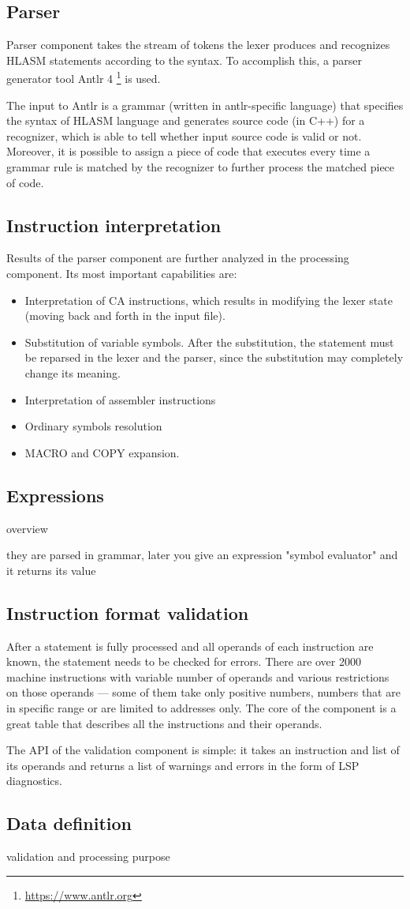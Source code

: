 \subsection{Parser}

Parser component takes the stream of tokens the lexer produces and recognizes HLASM statements according to the syntax. To accomplish this, a parser generator tool Antlr 4 \footnote{\url{https://www.antlr.org}} is used.

The input to Antlr is a grammar (written in antlr-specific language) that specifies the syntax of HLASM language and generates source code (in C++) for a recognizer, which is able to tell whether input source code is valid or not. Moreover, it is possible to assign a piece of code that executes every time a grammar rule is matched by the recognizer to further process the matched piece of code.

\subsection{Instruction interpretation}

Results of the parser component are further analyzed in the processing component. Its most important capabilities are:
\begin{itemize}
	\item Interpretation of CA instructions, which results in modifying the lexer state (moving back and forth in the input file).
	\item Substitution of variable symbols. After the substitution, the statement must be reparsed in the lexer and the parser, since the substitution may completely change its meaning.
	\item Interpretation of assembler instructions
	\item Ordinary symbols resolution
	\item MACRO and COPY expansion.
\end{itemize}

\subsection{Expressions}
overview

they are parsed in grammar, later you give an expression "symbol evaluator" and it returns its value

\subsection{Instruction format validation}
After a statement is fully processed and all operands of each instruction are known, the statement needs to be checked for errors. There are over 2000 machine instructions with variable number of operands and various restrictions on those operands --- some of them take only positive numbers, numbers that are in specific range or are limited to addresses only. The core of the component is a great table that describes all the instructions and their operands.

The API of the validation component is simple: it takes an instruction and list of its operands and returns a list of warnings and errors in the form of LSP diagnostics.

\subsection{Data definition}

validation and processing purpose
